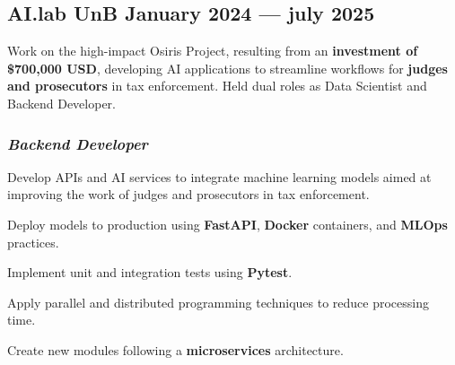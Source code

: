 \documentclass[a4paper,12pt]{article}
\begin{document}

\subsection*{\large AI.lab UnB \hfill January 2024 --- july 2025}
\vspace{0.5em}

Work on the high-impact Osiris Project, resulting from an \textbf{investment of \$700,000 USD}, developing AI applications to streamline workflows for \textbf{judges and prosecutors} in tax enforcement. Held dual roles as Data Scientist and Backend Developer.

\subsubsection*{\small \textit{Backend Developer}}
\vspace{-1.3em}
\vspace{-0.5em}
\begin{zitemize}
    \item Develop APIs and AI services to integrate machine learning models aimed at improving the work of judges and prosecutors in tax enforcement.
    \item Deploy models to production using \textbf{FastAPI}, \textbf{Docker} containers, and \textbf{MLOps} practices.
    \item Implement unit and integration tests using \textbf{Pytest}.
    \item Apply parallel and distributed programming techniques to reduce processing time.
    \item Create new modules following a \textbf{microservices} architecture.
\end{zitemize}
\end{document}
